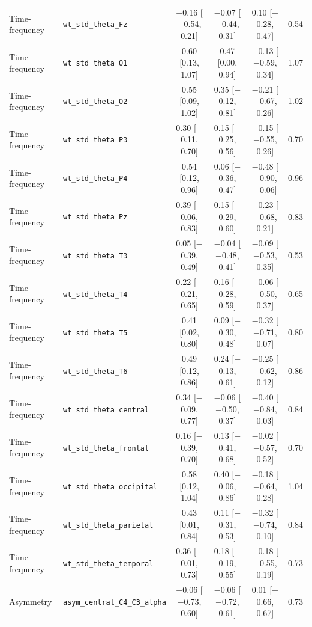 {\begin{longtable}{llcccc}
Time-frequency & \texttt{wt\_std\_theta\_Fz} & $-$0.16 [$-$0.54, 0.21] & $-$0.07 [$-$0.44, 0.31] & 0.10 [$-$0.28, 0.47] & 0.54 \\
Time-frequency & \texttt{wt\_std\_theta\_O1} & 0.60 [0.13, 1.07] & 0.47 [0.00, 0.94] & $-$0.13 [$-$0.59, 0.34] & 1.07 \\
Time-frequency & \texttt{wt\_std\_theta\_O2} & 0.55 [0.09, 1.02] & 0.35 [$-$0.12, 0.81] & $-$0.21 [$-$0.67, 0.26] & 1.02 \\
Time-frequency & \texttt{wt\_std\_theta\_P3} & 0.30 [$-$0.11, 0.70] & 0.15 [$-$0.25, 0.56] & $-$0.15 [$-$0.55, 0.26] & 0.70 \\
Time-frequency & \texttt{wt\_std\_theta\_P4} & 0.54 [0.12, 0.96] & 0.06 [$-$0.36, 0.47] & $-$0.48 [$-$0.90, $-$0.06] & 0.96 \\
Time-frequency & \texttt{wt\_std\_theta\_Pz} & 0.39 [$-$0.06, 0.83] & 0.15 [$-$0.29, 0.60] & $-$0.23 [$-$0.68, 0.21] & 0.83 \\
Time-frequency & \texttt{wt\_std\_theta\_T3} & 0.05 [$-$0.39, 0.49] & $-$0.04 [$-$0.48, 0.41] & $-$0.09 [$-$0.53, 0.35] & 0.53 \\
Time-frequency & \texttt{wt\_std\_theta\_T4} & 0.22 [$-$0.21, 0.65] & 0.16 [$-$0.28, 0.59] & $-$0.06 [$-$0.50, 0.37] & 0.65 \\
Time-frequency & \texttt{wt\_std\_theta\_T5} & 0.41 [0.02, 0.80] & 0.09 [$-$0.30, 0.48] & $-$0.32 [$-$0.71, 0.07] & 0.80 \\
Time-frequency & \texttt{wt\_std\_theta\_T6} & 0.49 [0.12, 0.86] & 0.24 [$-$0.13, 0.61] & $-$0.25 [$-$0.62, 0.12] & 0.86 \\
Time-frequency & \texttt{wt\_std\_theta\_central} & 0.34 [$-$0.09, 0.77] & $-$0.06 [$-$0.50, 0.37] & $-$0.40 [$-$0.84, 0.03] & 0.84 \\
Time-frequency & \texttt{wt\_std\_theta\_frontal} & 0.16 [$-$0.39, 0.70] & 0.13 [$-$0.41, 0.68] & $-$0.02 [$-$0.57, 0.52] & 0.70 \\
Time-frequency & \texttt{wt\_std\_theta\_occipital} & 0.58 [0.12, 1.04] & 0.40 [$-$0.06, 0.86] & $-$0.18 [$-$0.64, 0.28] & 1.04 \\
Time-frequency & \texttt{wt\_std\_theta\_parietal} & 0.43 [0.01, 0.84] & 0.11 [$-$0.31, 0.53] & $-$0.32 [$-$0.74, 0.10] & 0.84 \\
Time-frequency & \texttt{wt\_std\_theta\_temporal} & 0.36 [$-$0.01, 0.73] & 0.18 [$-$0.19, 0.55] & $-$0.18 [$-$0.55, 0.19] & 0.73 \\
Asymmetry & \texttt{asym\_central\_C4\_C3\_alpha} & $-$0.06 [$-$0.73, 0.60] & $-$0.06 [$-$0.72, 0.61] & 0.01 [$-$0.66, 0.67] & 0.73 \\

\end{longtable}}
